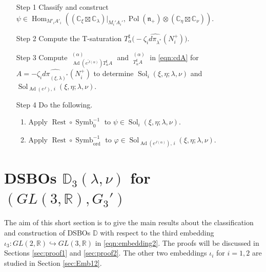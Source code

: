 \documentclass[a4paper,11pt,reqno]{amsart}
\newcommand{\CC}{\mathbb{C}}
\newcommand{\DD}{\mathbb{D}}
\newcommand{\0}{{\bf 0}}
\newcommand{\R}{\mathbb{R}}
\newcommand{\1}{{\bf 1}}
\DeclareMathOperator{\Ad}{Ad}
\DeclareMathOperator{\Hom}{Hom}
\DeclareMathOperator{\Pol}{Pol}
\newcommand{\ord}{{\mathrm{ord}}}
\DeclareMathOperator{\Sol}{Sol}
\newcommand{\wJ}{\widetilde{J}}
\DeclareMathOperator{\Symb}{Symb}
\DeclareMathOperator{\Rest}{Rest}
\DeclareMathOperator{\wSol}{\widetilde{\Sol}}
\theoremstyle{plain}
\theoremstyle{definition}
\numberwithin{equation}{section}
\theoremstyle{definition}
\begin{document}
\begin{enumerate}

\item[Step 1]
Classify and construct
$\psi \in \Hom_{M'_iA'_i}((\CC_\xi\boxtimes \CC_{\lambda})\big\rvert_{M_i'A_i'}, 
\Pol(\mathfrak{n}_+)\otimes (\CC_{\eta}\boxtimes\CC_{\nu}))$.
\vskip 0.1in

\item[Step 2]
Compute the T-saturation
$T_\alpha^\sharp \big(-\zeta_i\widehat{d\pi_{\lambda^*}}(N_i^+)\big)$. 
\vskip 0.1in

\item[Step 3]
Compute
$\wSol_{\Ad(e^{\wJ(\alpha)})T_\alpha^\sharp A}^{(\alpha)}$
and
$\wSol_{T_\alpha^\sharp A}^{(\alpha)}$
in  \eqref{eqn:cdA} for 
$A=-\zeta_i\widehat{d\pi_{(\xi,\lambda)^*}}(N_i^+)$ 
to determine
$\Sol_{i}(\xi,\eta; \lambda,\nu)$
and 
$\Sol_{\Ad(e^{J}),\, i}(\xi,\eta; \lambda,\nu)$.

\vskip 0.1in

\item[Step 4]
Do the following.
\vspace{3pt}

\begin{enumerate}
\item 
Apply $\Rest \circ \Symb_0^{-1}$
to $\psi \in \Sol_{i}(\xi,\eta; \lambda,\nu)$.
\vspace{5pt}

\item
Apply $\Rest \circ\Symb_{\ord}^{-1}$
to  $\varphi \in \Sol_{\Ad(e^{J(\alpha)}),\, i}(\xi,\eta; \lambda,\nu)$.

\end{enumerate}

\end{enumerate}

\section{DSBOs \texorpdfstring{$\DD_3(\lambda,\nu)$}{D₃(λ,ν)} for \texorpdfstring{$(GL(3,\R), G_3')$}{(GL(3,R),G₃')}}
\label{sec:Emb3}

The aim of this short section is to give the main results about
the classification and construction of DSBOs $\mathbb{D}$ with
respect to the third embedding 
$\iota_3 \colon GL(2,\R) \hookrightarrow GL(3,\R)$ 
in \eqref{eqn:embedding2}. The proofs will be discussed in Sections 
\ref{sec:proof1} and \ref{sec:proof2}.
The other two embeddings $\iota_i$ for $i=1,2$ are 
studied in Section \ref{sec:Emb12}.
\end{document}
